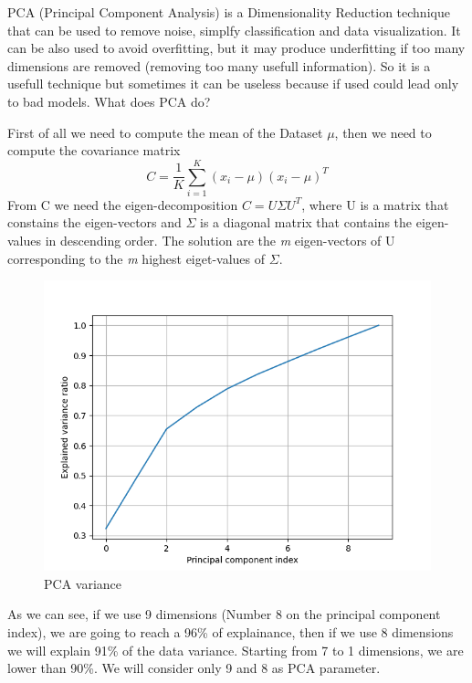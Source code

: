 \documentclass[english]{report}
\begin{document}
    PCA (Principal Component Analysis) is a Dimensionality Reduction technique that can be used to
    remove noise, simplfy classification and data visualization. It can be also used to avoid overfitting,
    but it may produce underfitting if too many dimensions are removed (removing too many usefull 
    information). So it is a usefull technique but sometimes it can be useless because if used could
    lead only to bad models. \newline\newline
    What does PCA do? 

    First of all we need to compute the mean of the Dataset $\mu$, then we need to compute the covariance
    matrix 
    \[C = \frac{1}{K} \sum_{i=1}^{K} (x_i-\mu)(x_i-\mu)^T \]
    From C we need the eigen-decomposition \(C = U \Sigma U^T \), where U is a matrix that
    constains the eigen-vectors and $\Sigma$ is a diagonal matrix that contains the eigen-values
    in descending order.
    The solution are the \textit{m} eigen-vectors of U corresponding to the \textit{m} 
    highest eiget-values of $\Sigma$.


    \begin{figure}[H]
        \includegraphics[scale=0.5]{../../images/feature_plot/PCA_explainedVariance.png}
        \centering
        \caption{PCA variance}
    \end{figure}
    As we can see, if we use 9 dimensions (Number 8 on the principal component index), we are going to
    reach a 96\% of explainance, then if we use 8 dimensions we will explain 91\% of the data variance.
    Starting from 7 to 1 dimensions, we are lower than 90\%. \newline
    We will consider only 9 and 8 as PCA parameter.
\end{document}
